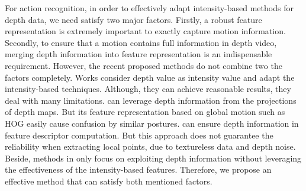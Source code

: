\documentclass[review]{elsarticle}
\begin{document}
For action recognition, in order to effectively adapt intensity-based methods for depth data, we need satisfy two major factors. Firstly, a robust feature representation is extremely important to exactly capture motion information. Secondly, to ensure that a motion contains full information in depth video, merging depth information into feature representation is an indispensable requirement. However, the recent proposed methods do not combine two the factors completely. Works \cite{yang2012recognizing, xia2013spatio} consider depth value as intensity value and adapt the intensity-based techniques. Although, they can achieve reasonable results, they deal with many limitations. \cite{yang2012recognizing} can leverage depth information from the projections of depth maps. But its feature representation based on global motion such as HOG easily cause confusion by similar postures. \cite{xia2013spatio} can ensure depth information in feature descriptor computation. But this approach does not guarantee the reliability when extracting local points, due to textureless data and depth noise. Beside, methods in \cite{wang2012mining, oreifej2013hon4d} only focus on exploiting depth information without leveraging the effectiveness of the intensity-based features. Therefore, we propose an effective method that can satisfy both mentioned factors.
\end{document}
